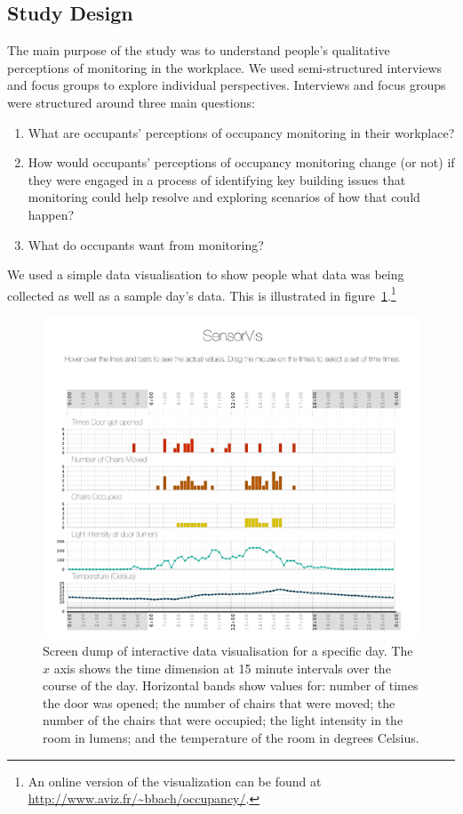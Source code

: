 
\subsection{Study Design}
\label{sec:study-design}

The main purpose of the study was to understand people’s qualitative
perceptions of monitoring in the workplace. We used semi-structured
interviews and focus groups to explore individual perspectives. 
Interviews and focus groups were structured around three main
questions:

\begin{enumerate}
\item What are occupants’ perceptions of occupancy monitoring in their workplace?
\item How would occupants’ perceptions of occupancy monitoring change
  (or not) if they were engaged in a process of identifying key
  building issues that monitoring could help resolve and exploring
  scenarios of how that could happen? 
\item What do occupants want from monitoring?
\end{enumerate}

We used a simple data visualisation to show people what data was being
collected as well as a sample day’s data. This is illustrated in
figure~\ref{fig:dataviz}.\footnote{
An online version of the visualization can be found at \url{http://www.aviz.fr/~bbach/occupancy/}.
}

\begin{figure}
  \centering
  \includegraphics[scale=0.25]{images/occupancy.png}
  \caption{Screen dump of interactive data visualisation for a
    specific day. The $x$ axis shows the time dimension at 15 minute
    intervals over the course of the day. Horizontal bands show values
    for:  number of times the
    door was opened; the number of chairs that were moved; the number
    of the chairs that were occupied; the light intensity in the room
    in lumens; and the temperature of the room in degrees Celsius.}
  \label{fig:dataviz}
\end{figure}


